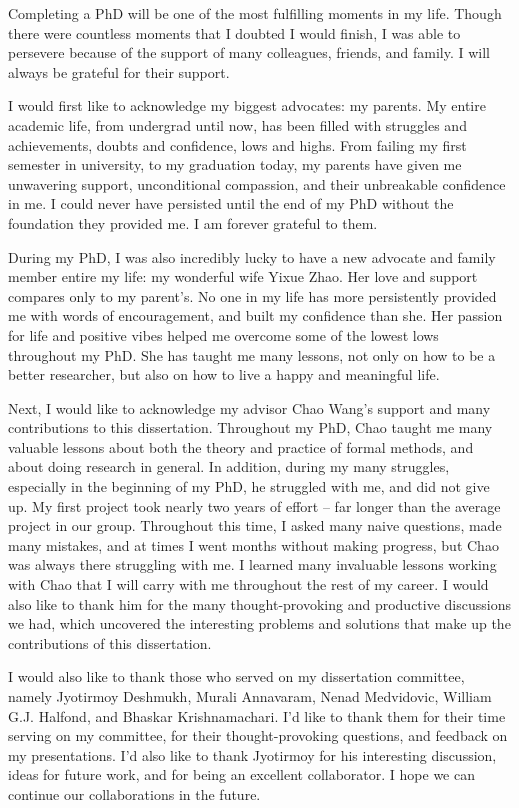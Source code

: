 Completing a PhD will be one of the most fulfilling moments in my life. Though
there were countless moments that I doubted I would finish, I was able to
persevere because of the support of many colleagues, friends, and family. I will
always be grateful for their support.

I would first like to acknowledge my biggest advocates: my parents. My entire
academic life, from undergrad until now, has been filled with struggles and
achievements, doubts and confidence, lows and highs. From failing my first
semester in university, to my graduation today, my parents have given me
unwavering support, unconditional compassion, and their unbreakable confidence in
me. I could never have persisted until the end of my PhD without the foundation
they provided me. I am forever grateful to them.

During my PhD, I was also incredibly lucky to have a new advocate and family
member entire my life: my wonderful wife Yixue Zhao. Her love and support
compares only to my parent's. No one in my life has more persistently provided me
with words of encouragement, and built my confidence than she. Her passion for
life and positive vibes helped me overcome some of the lowest lows throughout my
PhD. She has taught me many lessons, not only on how to be a better researcher,
but also on how to live a happy and meaningful life.

Next, I would like to acknowledge my advisor Chao Wang's support and many
contributions to this dissertation. Throughout my PhD, Chao taught me many
valuable lessons about both the theory and practice of formal methods, and about
doing research in general. In addition, during my many struggles, especially in
the beginning of my PhD, he struggled with me, and did not give up. My first
project took nearly two years of effort -- far longer than the average project in
our group. Throughout this time, I asked many naive questions, made many
mistakes, and at times I went months without making progress, but Chao was always
there struggling with me. I learned many invaluable lessons working with Chao
that I will carry with me throughout the rest of my career. I would also like to
thank him for the many thought-provoking and productive discussions we had, which
uncovered the interesting problems and solutions that make up the contributions
of this dissertation.

I would also like to thank those who served on my dissertation committee, namely
Jyotirmoy Deshmukh, Murali Annavaram, Nenad Medvidovic, William G.J. Halfond, and
Bhaskar Krishnamachari. I'd like to thank them for their time serving on my
committee, for their thought-provoking questions, and feedback on my
presentations. I'd also like to thank Jyotirmoy for his interesting discussion,
ideas for future work, and for being an excellent collaborator. I hope we can
continue our collaborations in the future.

